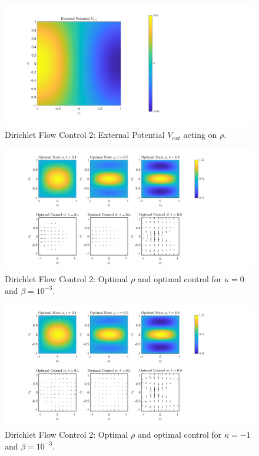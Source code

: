 \documentclass[11pt, a4paper]{article}
\theoremstyle{definition}
\begin{document}
	
	\begin{figure}[h]
		\centering
		\includegraphics[scale=0.35]{FcEx2Vextb.png}
		\caption{Dirichlet Flow Control 2: External Potential $V_{ext}$ acting on $\rho$.} 
		\label{F5V}
	\end{figure}
	\begin{figure}[h]
		\centering
		\includegraphics[scale=0.35]{FcEx2k0b.png}
		\caption{Dirichlet Flow Control 2: Optimal $\rho$ and optimal control for $\kappa = 0$ and $\beta = 10^{-3}$.} 
		\label{F5a}
	\end{figure}
	\begin{figure}[h]
		\centering
		\includegraphics[scale=0.35]{FcEx2kn1b.png}
		\caption{Dirichlet Flow Control 2: Optimal $\rho$ and optimal control for $\kappa = -1$ and $\beta = 10^{-3}$.} 
		\label{F5b}
	\end{figure}
\end{document}
